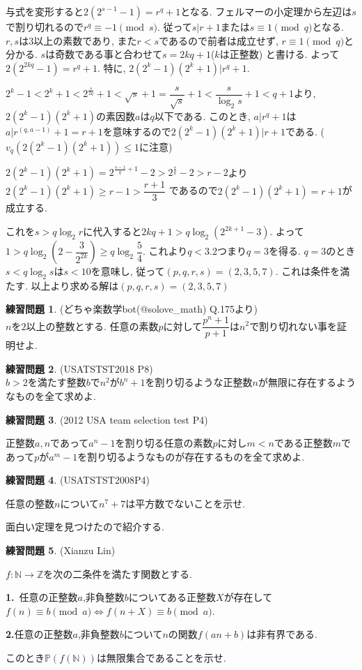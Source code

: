 \documentclass{ltjsarticle}
\theoremstyle{definition}
\newtheorem{prob}{練習問題}
\begin{document}
与式を変形すると$2(2^{s-1}-1)=r^q+1$となる. フェルマーの小定理から左辺は$s$で割り切れるので$r^q\equiv-1\pmod s$. 従って$s|r+1$または$s\equiv1\pmod q$となる. $r,s$は$3$以上の素数であり, また$r<s$であるので前者は成立せず, $r\equiv 1\pmod q$と分かる. $s$は奇数である事と合わせて$s=2kq+1$($k$は正整数) と書ける. よって$2(2^{2kq}-1)=r^q+1$. 特に, $2(2^k-1)(2^k+1)|r^q+1$.

$2^k-1<2^k+1<2^{\frac{s}{2q}}+1<\sqrt{s}+1=\dfrac{s}{\sqrt s}+1<\dfrac{s}{\log_2s}+1<q+1$より, $2(2^k-1)(2^k+1)$の素因数$a$は$q$以下である. このとき, $a|r^q+1$は$a|r^{(q,a-1)}+1=r+1$を意味するので$2(2^k-1)(2^k+1)|r+1$である. ($v_q(2(2^k-1)(2^k+1))\leq1$に注意)

$2(2^k-1)(2^k+1)=2^{\frac{s-1}q+1}-2>2^{\frac sq}-2>r-2$より$2(2^k-1)(2^k+1)\geq r-1>\dfrac{r+1}3$ であるので$2(2^k-1)(2^k+1)=r+1$が成立する.

これを$s>q\log_2 r$に代入すると$2kq+1>q\log_2(2^{2k+1}-3)$. よって$1>q\log_2\left(2-\dfrac3{2^{2k}}\right)\geq q\log_2\dfrac54$. これより$q<3.2$つまり$q=3$を得る. $q=3$のとき$s<q\log_2s$は$s<10$を意味し, 従って$(p,q,r,s)=(2,3,5,7)$. これは条件を満たす. 以上より求める解は$(p,q,r,s)=(2,3,5,7)$

\begin{prob}(どちゃ楽数学bot(@solove\_math) Q.175より)\\
$n$を$2$以上の整数とする. 任意の素数$p$に対して$\dfrac{p^n+1}{p+1}$は$n^2$で割り切れない事を証明せよ.
\end{prob}

\begin{prob}(USATSTST2018 P8)\\
$b > 2$を満たす整数$b$で$n^2$が$b^n+1$を割り切るような正整数$n$が無限に存在するようなものを全て求めよ.
\end{prob}

\begin{prob}(2012 USA team selection test P4)

正整数$a,n$であって$a^n-1$を割り切る任意の素数$p$に対し$m<n$である正整数$m$であって$p$が$a^m-1$を割り切るようなものが存在するものを全て求めよ.
\end{prob}

\begin{prob}(USATSTST2008P4)

任意の整数$n$について$n^7+7$は平方数でないことを示せ.
\end{prob}

面白い定理を見つけたので紹介する.
\begin{prob}(Xianzu Lin)

$f:\mathbb N\to\mathbb Z$を次の二条件を満たす関数とする.

\textbf{1.}\ 任意の正整数$a$,非負整数$b$についてある正整数$X$が存在して$f(n)\equiv b\pmod a\Leftrightarrow f(n+X)\equiv b\pmod a$.


\textbf{2.}任意の正整数$a$,非負整数$b$について$n$の関数$f(an+b)$は非有界である.

このとき$\mathbb P(f(\mathbb N))$は無限集合であることを示せ.
\end{prob}
\end{document}
